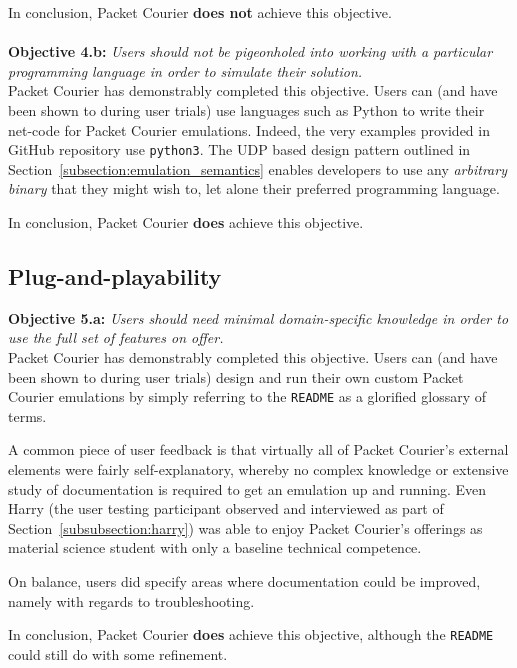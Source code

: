 In conclusion, Packet Courier \textbf{does not} achieve this objective. \\ \\

\textbf{Objective 4.b:} \emph{Users should not be pigeonholed into working with a particular programming language in
order to simulate their solution.} \\

Packet Courier has demonstrably completed this objective. Users can (and have been shown to during user trials) use
languages such as Python to write their net-code for Packet Courier emulations. Indeed, the very examples provided in
GitHub repository use \texttt{python3}. The UDP based design pattern outlined in
Section~\ref{subsection:emulation_semantics} enables developers to use any \emph{arbitrary binary} that they might
wish to, let alone their preferred programming language.

In conclusion, Packet Courier \textbf{does} achieve this objective.

\subsection{Plug-and-playability}\label{subsection:plug_and_playability}

\textbf{Objective 5.a:} \emph{Users should need minimal domain-specific knowledge in order to use the full set of
features on offer.} \\

Packet Courier has demonstrably completed this objective. Users can (and have been shown to during user trials)
design and run their own custom Packet Courier emulations by simply referring to the \texttt{README} as a glorified
glossary of terms.

A common piece of user feedback is that virtually all of Packet Courier's external elements were fairly
self-explanatory, whereby no complex knowledge or extensive study of documentation is required to get an emulation up
and running. Even Harry (the user testing participant observed and interviewed as part of
Section~\ref{subsubsection:harry}) was able to enjoy Packet Courier's offerings as material science student with
only a baseline technical competence.

On balance, users did specify areas where documentation could be improved, namely with regards to troubleshooting.

In conclusion, Packet Courier \textbf{does} achieve this objective, although the \texttt{README} could still do with
some refinement. \\ \\

